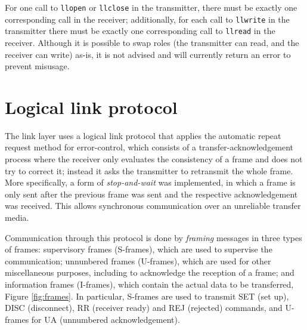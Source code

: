\documentclass[a4paper, 11pt]{report}
\begin{document}
For one call to \texttt{llopen} or \texttt{llclose} in the transmitter, there must be exactly one corresponding call in the receiver; additionally, for each call to \texttt{llwrite} in the transmitter there must be exactly one corresponding call to \texttt{llread} in the receiver. Although it is possible to swap roles (the transmitter can read, and the receiver can write) as-is, it is not advised and will currently return an error to prevent misusage.

\section{Logical link protocol} \label{sec:LLProtocol}

The link layer uses a logical link protocol that applies the automatic repeat request method for error-control, which consists of a transfer-acknowledgement process where the receiver only evaluates the consistency of a frame and does not try to correct it; instead it asks the transmitter to retransmit the whole frame. More specifically, a form of \textit{stop-and-wait} was implemented, in which a frame is only sent after the previous frame was sent and the respective acknowledgement was received. This allows synchronous communication over an unreliable transfer media.

Communication through this protocol is done by \textit{framing} messages in three types of frames: supervisory frames (S-frames), which are used to supervise the communication; unnunbered frames (U-frames), which are used for other miscellaneous purposes, including to acknowledge the reception of a frame; and information frames (I-frames), which contain the actual data to be transferred, Figure \ref{fig:frames}. In particular, S-frames are used to transmit SET (set up), DISC (disconnect), RR (receiver ready) and REJ (rejected) commands, and U-frames for UA (unnumbered acknowledgement).
\end{document}
